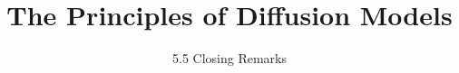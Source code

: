 ﻿%

\graphicspath{{../images/}}
\title{The Principles of Diffusion Models}
\subtitle{5.5 Closing Remarks}


\begin{frame}
    \titlepage
\end{frame}


